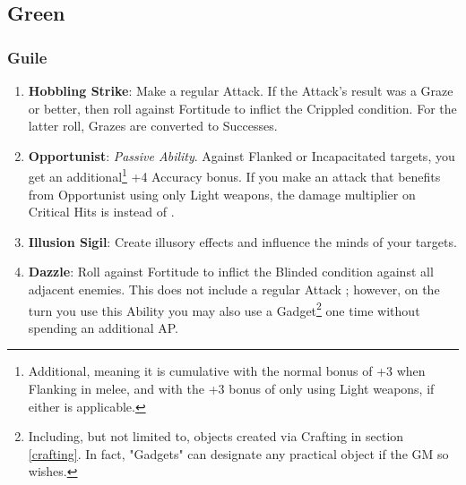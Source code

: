 \subsection{Green}

\subsubsection{Guile}
\begin{enumerate}
    \item \textbf{Hobbling Strike}: Make a regular Attack. If the Attack's result was a Graze or better, then roll against Fortitude to inflict the Crippled condition. For the latter roll, Grazes are converted to Successes.
    \item \textbf{Opportunist}: \textit{Passive Ability}. Against Flanked or Incapacitated targets, you get an additional\footnote{Additional, meaning it is cumulative with the normal bonus of +3 when Flanking in melee, and with the +3 bonus of only using Light weapons, if either is applicable.} +4 Accuracy bonus. If you make an attack that benefits from Opportunist using only Light weapons, the damage multiplier on Critical Hits is  instead of .
    \item \textbf{Illusion Sigil}: Create illusory effects and influence the minds of your targets.
    \item \textbf{Dazzle}: Roll against Fortitude to inflict the Blinded condition against all adjacent enemies. This does not include a regular Attack ; however, on the turn you use this Ability you may also use a Gadget\footnote{Including, but not limited to, objects created via Crafting in section \ref{crafting}. In fact, "Gadgets" can designate any practical object if the GM so wishes.} one time without spending an additional AP.
\end{enumerate}

